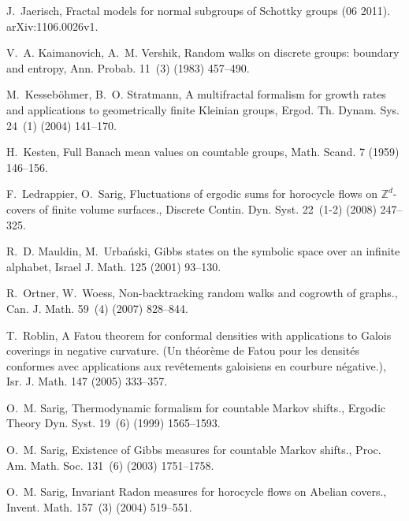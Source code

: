 \documentclass[10pt]{article}
\theoremstyle{mystyle}
\newcommand{\1}{\mathbf{1}}
\begin{document}
\begin{thebibliography}{10}
J.~Jaerisch, %
{Fractal models for normal subgroups of Schottky groups} (06 2011).\newblock %
{{arXiv:1106.0026v1}}.

V.~A. Kaimanovich, A.~M. Vershik,
  {Random walks on discrete groups: boundary and entropy}, Ann. Probab. 11~(3) (1983)
  457--490.

M.~Kesseb{\"o}hmer, B.~O. Stratmann,
  {A multifractal formalism for growth rates and applications to geometrically
  finite {K}leinian groups}, Ergod. Th. Dynam. Sys. 24~(1) (2004) 141--170.
  
H.~Kesten,
  {Full {B}anach mean values on countable groups}, Math. Scand. 7 (1959) 146--156.

F.~Ledrappier, O.~Sarig, {Fluctuations of ergodic sums for horocycle flows on
  $\mathbb{Z}^d$-covers of finite volume surfaces.}, Discrete Contin. Dyn. Syst.
  22~(1-2) (2008) 247--325.
  
R.~D. Mauldin, M.~Urba{\'n}ski, Gibbs states on the symbolic space over an
  infinite alphabet, Israel J. Math. 125 (2001) 93--130.

R.~Ortner, W.~Woess, {Non-backtracking random walks and cogrowth of graphs.},
  Can. J. Math. 59~(4) (2007) 828--844.

T.~Roblin, {A Fatou theorem for conformal densities with applications to Galois
  coverings in negative curvature. (Un th{\'e}or{\`e}me de Fatou pour les
  densit{\'e}s conformes avec applications aux rev\^{e}tements galoisiens en
  courbure n{\'e}gative.)}, Isr. J. Math. 147 (2005) 333--357.

O.~M. Sarig, {Thermodynamic formalism for countable Markov shifts.}, Ergodic
  Theory Dyn. Syst. 19~(6) (1999) 1565--1593.

O.~M. Sarig, {Existence of Gibbs measures for countable Markov shifts.}, Proc.
  Am. Math. Soc. 131~(6) (2003) 1751--1758.

O.~M. Sarig, {Invariant Radon measures for horocycle flows on Abelian covers.},
  Invent. Math. 157~(3) (2004) 519--551.


\end{thebibliography}
\end{document}
